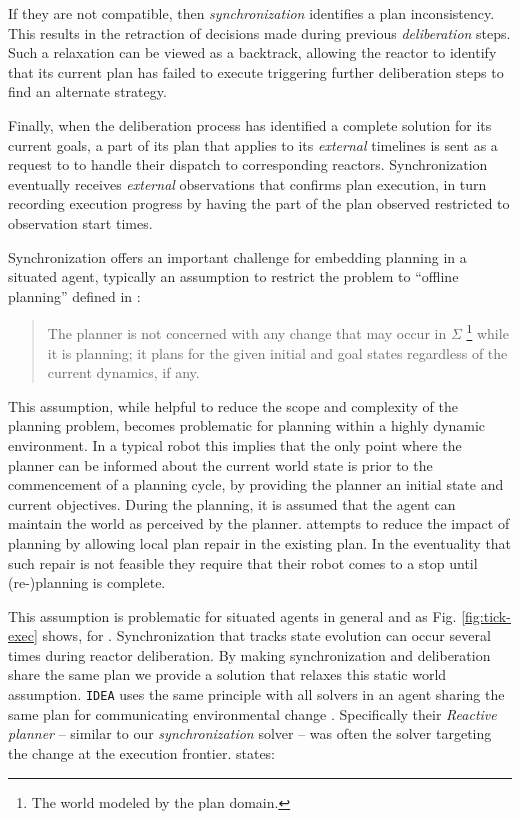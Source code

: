 If they are not compatible, then {\em synchronization} identifies a
plan inconsistency. This results in the retraction of decisions made
during previous {\em deliberation} steps.  Such a relaxation can be
viewed as a backtrack, allowing the reactor to identify that its
current plan has failed to execute triggering further deliberation
steps to find an alternate strategy.

Finally, when the deliberation process has identified a complete
solution for its current goals, a part of its plan that applies to its
{\em external} timelines is sent as a request to \rx to handle their
dispatch to corresponding reactors.  Synchronization eventually
receives {\em external } observations that confirms plan execution, in
turn recording execution progress by having the part of the plan
observed restricted to observation start times.

Synchronization offers an important challenge for embedding planning
in a situated agent, typically an assumption to restrict the problem
to ``offline planning'' defined in \cite{ghallab04}:

{\scriptsize
  \begin{quote}
    The planner is not concerned with any change that may occur in
    $\Sigma$ \footnote{The world modeled by the plan domain.} while it
    is planning; it plans for the given initial and goal states
    regardless of the current dynamics, if any.
\end{quote}}

This assumption, while helpful to reduce the scope and complexity of
the planning problem, becomes problematic for planning within a highly
dynamic environment. In a typical robot this implies that the only
point where the planner can be informed about the current world state
is prior to the commencement of a planning cycle, by providing the
planner an initial state and current objectives. During the planning,
it is assumed that the agent can maintain the world as perceived by
the planner. \cite{lemai04, lemai-chenevier2004} attempts to reduce
the impact of planning by allowing local plan repair in the existing
plan. In the eventuality that such repair is not feasible they require
that their robot comes to a stop until (re-)planning is complete.  

This assumption is problematic for situated agents in general and as
Fig. \ref{fig:tick-exec} shows, for \rxe. Synchronization that tracks
state evolution can occur several times during reactor
deliberation. By making synchronization and deliberation share the
same plan we provide a solution that relaxes this static world
assumption. \texttt{IDEA} uses the same principle with all solvers in
an agent sharing the same plan for communicating environmental change
\cite{Dias:2003ua, mus06}. Specifically their {\em Reactive planner}
-- similar to our {\em synchronization} solver -- was often the solver
targeting the change at the execution frontier. 
\cite{Dias:2003ua} states:

